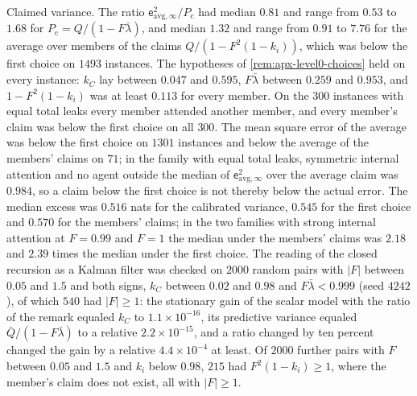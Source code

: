 \begin{numcheck}
Claimed variance. The ratio $\mathsf e_{\mathrm{avg},\infty}^2/P_{\mathrm c}$ had median $0.81$ and range from $0.53$ to $1.68$ for $P_{\mathrm c}=Q/(1-F\bar\lambda)$, and median $1.32$ and range from $0.91$ to $7.76$ for the average over members of the claims $Q/(1-F^2(1-k_i))$, which was below the first choice on $1493$ instances. The hypotheses of \cref{rem:apx-level0-choices} held on every instance: $k_C$ lay between $0.047$ and $0.595$, $F\bar\lambda$ between $0.259$ and $0.953$, and $1-F^2(1-k_i)$ was at least $0.113$ for every member. On the $300$ instances with equal total leaks every member attended another member, and every member's claim was below the first choice on all $300$. The mean square error of the average was below the first choice on $1301$ instances and below the average of the members' claims on $71$; in the family with equal total leaks, symmetric internal attention and no agent outside the median of $\mathsf e_{\mathrm{avg},\infty}^2$ over the average claim was $0.984$, so a claim below the first choice is not thereby below the actual error. The median excess was $0.516$ nats for the calibrated variance, $0.545$ for the first choice and $0.570$ for the members' claims; in the two families with strong internal attention at $F=0.99$ and $F=1$ the median under the members' claims was $2.18$ and $2.39$ times the median under the first choice. The reading of the closed recursion as a Kalman filter was checked on $2000$ random pairs with $\lvert F\rvert$ between $0.05$ and $1.5$ and both signs, $k_C$ between $0.02$ and $0.98$ and $F\bar\lambda<0.999$ (seed $4242$), of which $540$ had $\lvert F\rvert\ge1$: the stationary gain of the scalar model with the ratio of the remark equaled $k_C$ to $1.1\times10^{-16}$, its predictive variance equaled $\bar Q/(1-F\bar\lambda)$ to a relative $2.2\times10^{-15}$, and a ratio changed by ten percent changed the gain by a relative $4.4\times10^{-4}$ at least. Of $2000$ further pairs with $F$ between $0.05$ and $1.5$ and $k_i$ below $0.98$, $215$ had $F^2(1-k_i)\ge1$, where the member's claim does not exist, all with $\lvert F\rvert\ge1$.


\end{numcheck}
